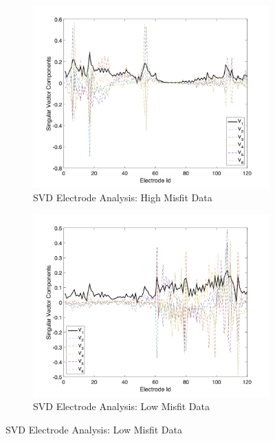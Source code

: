 \documentclass[final,authoryear,5p,times,twocolumn]{elsarticle}
\begin{document}
\begin{figure}[!ht]
   \centering

   \begin{subfigure}[b]{0.475\linewidth}
       \centering
       \includegraphics[trim=1.6cm 0.65cm 2.1cm 1.4cm, clip=true, width=\linewidth]{./Figures/Fig7a.png}
       \caption{SVD Electrode Analysis: High Misfit Data}
       \label{fig:DataQC_SVD_Elec_Bad}
   \end{subfigure}
   \hfill
   \begin{subfigure}[b]{0.475\linewidth}
       \centering
       \includegraphics[trim=1.6cm 0.65cm 2.1cm 1.4cm, clip=true, width=\linewidth]{./Figures/Fig7b.png}
       \caption{SVD Electrode Analysis: Low Misfit Data}
       \label{fig:DataQC_SVD_Elec_Good}
   \end{subfigure}


\end{figure}
\end{document}
